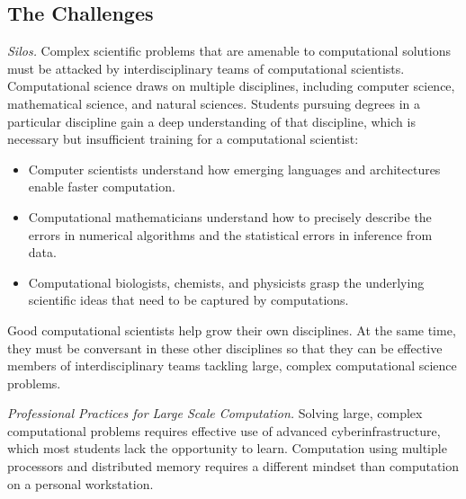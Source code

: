 \documentclass[11pt]{NSFamsart}
\begin{document}
\subsection{The Challenges}
\emph{Silos.}  Complex scientific problems that are amenable to computational solutions must be attacked by interdisciplinary teams of computational scientists.  Computational science draws on multiple disciplines, including computer science, mathematical science, and natural sciences.  Students pursuing degrees in a particular discipline gain a deep understanding of that discipline, which is necessary but insufficient training for a computational scientist:
\begin{itemize}
\item Computer scientists understand how emerging languages and architectures enable faster computation.  

\item Computational mathematicians understand how to precisely describe the errors in numerical algorithms and the statistical errors in inference from data.  

\item Computational biologists, chemists, and physicists grasp the underlying scientific ideas that need to be captured by computations.  

\end{itemize}
Good computational scientists help grow their own disciplines.  At the same time, they must be conversant in these other disciplines so that they can be effective members of  interdisciplinary teams tackling large, complex computational science problems.

\emph{Professional Practices for Large Scale Computation.}  Solving large, complex computational problems requires effective use of advanced cyberinfrastructure, which most students lack the opportunity to learn.  Computation using multiple processors and distributed memory requires a different mindset than computation on a personal workstation.  
\end{document}
